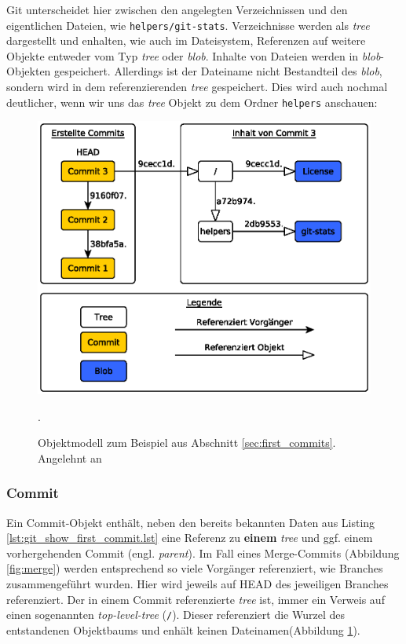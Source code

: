 

Git unterscheidet hier zwischen den angelegten Verzeichnissen und den
eigentlichen Dateien, wie \texttt{helpers/git-stats}. Verzeichnisse werden als
\textit{tree} dargestellt und enhalten, wie auch im Dateisystem, Referenzen auf
weitere Objekte entweder vom Typ \textit{tree} oder \textit{blob}.  Inhalte von
Dateien werden in \textit{blob}-Objekten gespeichert. Allerdings ist der
Dateiname nicht Bestandteil des \textit{blob}, sondern wird in dem
referenzierenden \textit{tree} gespeichert. Dies wird auch nochmal deutlicher,
wenn wir uns das \textit{tree} Objekt zu dem Ordner \texttt{helpers} anschauen:



\begin{figure}[h]
  \centering
  \includegraphics[scale=0.75]{images/objectmodel.eps}
  \caption{Objektmodell zum Beispiel aus Abschnitt \ref{sec:first_commits}.
  Angelehnt an \cite[S.~53]{gitosp}}.
  \label{fig:objectmodel}
\end{figure}

\subsubsection{Commit}\label{sec:commitobject} Ein Commit-Objekt enthält, neben
den bereits bekannten Daten aus Listing \ref{lst:git_show_first_commit.lst}
eine Referenz zu \textbf{einem} \textit{tree} und ggf. einem vorhergehenden
Commit (engl. \textit{parent}). Im Fall eines Merge-Commits (Abbildung
\ref{fig:merge}) werden entsprechend so viele Vorgänger referenziert, wie
Branches zusammengeführt wurden. Hier wird jeweils auf \gls{HEAD} des
jeweiligen Branches referenziert. Der in einem Commit referenzierte
\textit{tree} ist, immer ein Verweis auf einen sogenannten
\textit{top-level-tree} (\texttt{/}). Dieser referenziert die Wurzel des
entstandenen Objektbaums und enhält keinen Dateinamen(Abbildung
\ref{fig:objectmodel}).

